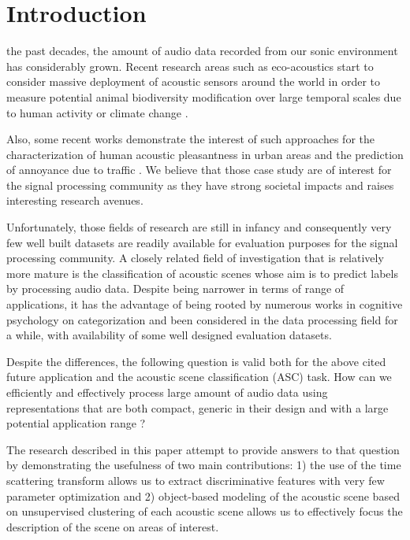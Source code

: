 \documentclass[journal]{IEEEtran}
\begin{document}
\section{Introduction}

 the past decades, the amount of audio data recorded from our sonic environment has considerably grown. Recent research areas such as eco-acoustics \cite{ECOACOUSTICS2014, krause} start to consider massive deployment of acoustic sensors around the world in order to measure potential animal biodiversity modification over large temporal scales due to human activity or climate change \cite{warren2006urban, NessSST13, stowell13a, stowell13b}. 

Also, some recent works demonstrate the interest of such approaches for the characterization of human acoustic pleasantness in urban areas \cite{lafayPartI, guyot2005urban, ricciardi2015sound} and the prediction of annoyance due to traffic \cite{gloaguen}. We believe that those case study are of interest for the signal processing community as they have strong societal impacts and raises interesting research avenues. 

Unfortunately, those fields of research are still in infancy and consequently very few well built datasets are readily available for evaluation purposes for the signal processing community. A closely related field of investigation that is relatively more mature is the classification of acoustic scenes whose aim is to predict labels by processing audio data. Despite being narrower in terms of range of applications, it has the advantage of being rooted by numerous works in cognitive psychology on categorization \cite{dubois2006cognitive, maffiolo_caracterisation_1999, guastavino_ideal_2006} and been considered in the data processing field for a while, with availability of some well designed evaluation datasets. 

Despite the differences, the following question is valid both for the above cited future application and the acoustic scene classification (ASC) task. How can we efficiently and effectively process large amount of audio data using representations that are both compact, generic in their design and with a large potential application range ?  

The research described in this paper attempt to provide answers to that question by demonstrating the usefulness of two main contributions: 1) the use of the time scattering transform allows us to extract discriminative features with very few parameter optimization and 2) object-based modeling of the acoustic scene based on unsupervised clustering of each acoustic scene  allows us to effectively focus the description of the scene on areas of interest. 
\end{document}
